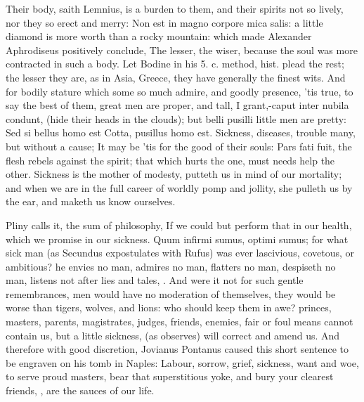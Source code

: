 {Their body, saith Lemnius, is a burden to them, and their spirits
not so lively, nor they so erect and merry: Non est in magno corpore
mica salis: a little diamond is more worth than a rocky mountain: which
made Alexander Aphrodiseus positively conclude, The lesser, the
wiser, because the soul was more contracted in such a body. Let
Bodine in his 5. c. method, hist. plead the rest; the lesser they are,
as in Asia, Greece, they have generally the finest wits. And for bodily
stature which some so much admire, and goodly presence, 'tis true, to
say the best of them, great men are proper, and tall, I grant,-caput
inter nubila condunt, (hide their heads in the clouds); but belli
pusilli little men are pretty: Sed si bellus homo est Cotta, pusillus
homo est. Sickness, diseases, trouble many, but without a cause;
It may be 'tis for the good of their souls: Pars fati fuit, the
flesh rebels against the spirit; that which hurts the one, must needs
help the other. Sickness is the mother of modesty, putteth us in mind
of our mortality; and when we are in the full career of worldly pomp
and jollity, she pulleth us by the ear, and maketh us know ourselves.

Pliny calls it, the sum of philosophy, If we could but perform
that in our health, which we promise in our sickness. Quum infirmi
sumus, optimi sumus; for what sick man (as  Secundus
expostulates with Rufus) was ever lascivious, covetous, or ambitious?
he envies no man, admires no man, flatters no man, despiseth no man,
listens not after lies and tales, \etc{}. And were it not for such gentle
remembrances, men would have no moderation of themselves, they would be
worse than tigers, wolves, and lions: who should keep them in awe?
princes, masters, parents, magistrates, judges, friends, enemies, fair
or foul means cannot contain us, but a little sickness, (as
\Chrysostom observes) will correct and amend us. And therefore
with good discretion, Jovianus Pontanus caused this short
sentence to be engraven on his tomb in Naples: Labour, sorrow, grief,
sickness, want and woe, to serve proud masters, bear that superstitious
yoke, and bury your clearest friends, \etc{}, are the sauces of our life.

}
